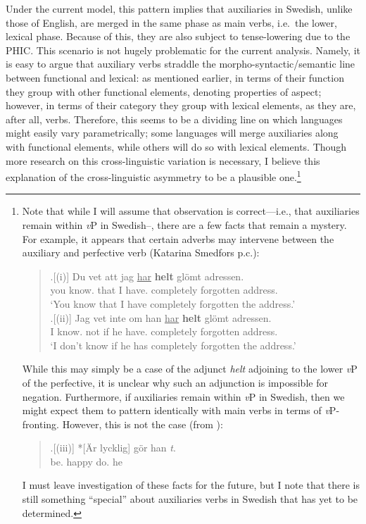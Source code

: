 Under the current model, this pattern implies that auxiliaries in Swedish, unlike those of English, are merged in the same phase as main verbs, i.e.\ the lower, lexical phase. Because of this, they are also subject to tense-lowering due to the PHIC. This scenario is not hugely problematic for the current analysis. Namely, it is easy to argue that auxiliary verbs straddle the morpho-syntactic/semantic line between functional and lexical: as mentioned earlier, in terms of their function they group with other functional elements, denoting properties of aspect; however, in terms of their category they group with lexical elements, as they are, after all, verbs. Therefore, this seems to be a dividing line on which languages might easily vary parametrically; some languages will merge auxiliaries along with functional elements, while others will do so with lexical elements. Though more research on this cross-linguistic variation is necessary, I believe this explanation of the cross-linguistic asymmetry to be a plausible one.\footnote{Note that while I will assume that  observation is correct---i.e., that auxiliaries remain within {\it v}P in Swedish--, there are a few facts that remain a mystery. For example, it appears that certain adverbs may intervene between the auxiliary and perfective verb (Katarina Smedfors p.c.):

\begin{quote}
\exg.[(i)] Du vet att jag \underline{har} \textbf{helt} gl\"{o}mt adressen.\\
you know.\mbox{} that I have.\mbox{} completely forgotten address.\mbox{}\\
`You know that I have completely forgotten the address.'\\

\exg.[(ii)] Jag vet inte om han \underline{har} \textbf{helt} gl\"{o}mt adressen.\\
I know.\mbox{} not if he have.\mbox{} completely forgotten address.\mbox{}\\
`I don't know if he has completely forgotten the address.'\\

\end{quote}
While this may simply be a case of the adjunct {\it helt} adjoining to the lower {\it v}P of the perfective, it is unclear why such an adjunction is impossible for negation. Furthermore, if auxiliaries remain within {\it v}P in Swedish, then we might expect them to pattern identically with main verbs in terms of {\it v}P-fronting. However, this is not the case (from ):

\begin{quote}
\exg.[(iii)] *[\"{A}r lycklig] g\"{o}r han {\it t}.\\
be.\mbox{} happy do.\mbox{} he\\

\end{quote}
I must leave investigation of these facts for the future, but I note that there is still something ``special'' about auxiliaries verbs in Swedish that has yet to be determined.}


